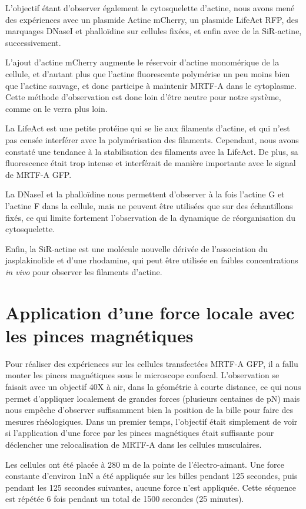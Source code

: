 L'objectif étant d'observer également le cytosquelette d'actine, nous avons mené des expériences avec un plasmide Actine mCherry, un plasmide LifeAct RFP, des marquages DNaseI et phalloïdine sur cellules fixées, et enfin avec de la SiR-actine, successivement.
 
L'ajout d'actine mCherry augmente le réservoir d'actine monomérique de la cellule, et d'autant plus que l'actine fluorescente polymérise un peu moins bien que l'actine sauvage, et donc participe à maintenir MRTF-A dans le cytoplasme. 
Cette méthode d'observation est donc loin d'être neutre pour notre système, comme on le verra plus loin.
 
La LifeAct \cite{riedl} est une petite protéine qui se lie aux filaments d'actine, et qui n'est pas censée interférer avec la polymérisation des filaments. Cependant, nous avons constaté une tendance à la stabilisation des filaments avec la LifeAct. De plus, sa fluorescence était trop intense et interférait de manière importante avec le signal de MRTF-A GFP. 

La DNaseI et la phalloïdine nous permettent d'observer à la fois l'actine G et l'actine F dans la cellule, mais ne peuvent être utilisées que sur des échantillons fixés, ce qui limite fortement l'observation de la dynamique de réorganisation du cytosquelette.
 
Enfin, la SiR-actine est une molécule nouvelle dérivée de l'association du jasplakinolide et d'une rhodamine, qui peut être utilisée en faibles concentrations \emph{in vivo} pour observer les filaments d'actine. 


\section{Application d'une force locale avec les pinces magnétiques}

Pour réaliser des expériences sur les cellules transfectées MRTF-A GFP, il a fallu monter les pinces magnétiques sous le microscope confocal. 
L'observation se faisait avec un objectif 40X à air, dans la géométrie à courte distance, ce qui nous permet d'appliquer localement de grandes forces (plusieurs centaines de pN) mais nous empêche d'observer suffisamment bien la position de la bille pour faire des mesures rhéologiques. 
Dans un premier temps, l'objectif était simplement de voir si l'application d'une force par les pinces magnétiques était suffisante pour déclencher une relocalisation de MRTF-A dans les cellules musculaires. 

Les cellules ont été placée à 280 \micro m de la pointe de l'électro-aimant. Une force constante d'environ 1nN a été appliquée sur les billes pendant 125 secondes, puis pendant les 125 secondes suivantes, aucune force n'est appliquée. Cette séquence est répétée 6 fois pendant un total de 1500 secondes (25 minutes). 

